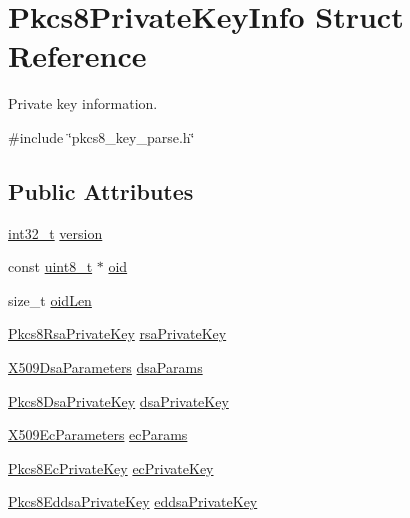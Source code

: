 \hypertarget{structPkcs8PrivateKeyInfo}{}\section{Pkcs8\+Private\+Key\+Info Struct Reference}
\label{structPkcs8PrivateKeyInfo}


Private key information.  




{\ttfamily \#include \char`\"{}pkcs8\+\_\+key\+\_\+parse.\+h\char`\"{}}

\subsection*{Public Attributes}
\begin{DoxyCompactItemize}
\item 
\hyperlink{stdint_8h_ab1967d8591af1a4e48c37fd2b0f184d0}{int32\+\_\+t} \hyperlink{structPkcs8PrivateKeyInfo_a4a1c74a37ee236610d867fedd0246e78}{version}
\item 
const \hyperlink{stdint_8h_aba7bc1797add20fe3efdf37ced1182c5}{uint8\+\_\+t} $\ast$ \hyperlink{structPkcs8PrivateKeyInfo_a233da5c7077e926f9d337e69892f4fb1}{oid}
\item 
size\+\_\+t \hyperlink{structPkcs8PrivateKeyInfo_a77b3088c43e5ad25a5caedcddcb15a2f}{oid\+Len}
\item 
\hyperlink{structPkcs8RsaPrivateKey}{Pkcs8\+Rsa\+Private\+Key} \hyperlink{structPkcs8PrivateKeyInfo_a283526fe608f6a28f2f7fcbd85ef67bb}{rsa\+Private\+Key}
\item 
\hyperlink{structX509DsaParameters}{X509\+Dsa\+Parameters} \hyperlink{structPkcs8PrivateKeyInfo_a39c25a14822c36dc314a432ebe8dda8c}{dsa\+Params}
\item 
\hyperlink{structPkcs8DsaPrivateKey}{Pkcs8\+Dsa\+Private\+Key} \hyperlink{structPkcs8PrivateKeyInfo_a652af88cbae3bcea5818155c8ca9d2db}{dsa\+Private\+Key}
\item 
\hyperlink{structX509EcParameters}{X509\+Ec\+Parameters} \hyperlink{structPkcs8PrivateKeyInfo_aac7a6c1cc222b5d7c40ade99d632f92f}{ec\+Params}
\item 
\hyperlink{structPkcs8EcPrivateKey}{Pkcs8\+Ec\+Private\+Key} \hyperlink{structPkcs8PrivateKeyInfo_abb7fbb9eeceb773e8d5ff034021429f2}{ec\+Private\+Key}
\item 
\hyperlink{structPkcs8EddsaPrivateKey}{Pkcs8\+Eddsa\+Private\+Key} \hyperlink{structPkcs8PrivateKeyInfo_aa760f743bbb0c67c24074058cecbe30f}{eddsa\+Private\+Key}
\end{DoxyCompactItemize}


